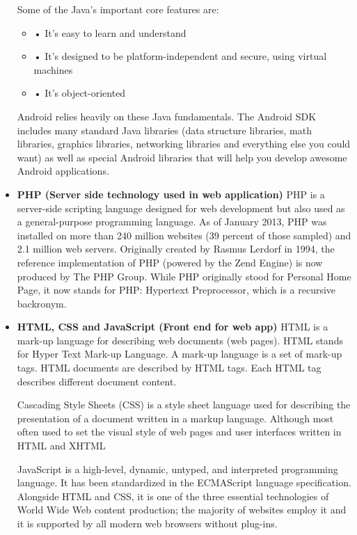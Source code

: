 \begin{itemize}
Some of the Java’s important core features are:
\begin{itemize}
\item	• It’s easy to learn and understand

\item •	It’s designed to be platform-independent and secure, using virtual machines

\item •	It’s object-oriented
\end{itemize}

Android relies heavily on these Java fundamentals. The Android SDK includes many standard Java libraries (data structure libraries, math libraries, graphics libraries, networking libraries and everything else you could want) as well as special Android libraries that will help you develop awesome Android applications.


\item	\textbf{PHP (Server side technology used in web application) }
PHP is a server-side scripting language designed for web development but also used as a general-purpose programming language. As of January 2013, PHP was installed on more than 240 million websites (39 percent of those sampled) and 2.1 million web servers. Originally created by Rasmus Lerdorf in 1994, the reference implementation of PHP (powered by the Zend Engine) is now produced by The PHP Group. While PHP originally stood for Personal Home Page, it now stands for PHP: Hypertext Preprocessor, which is a recursive backronym.

\item	\textbf{HTML, CSS and JavaScript (Front end for web app) }
HTML is a mark-up language for describing web documents (web pages). HTML stands for Hyper Text Mark-up Language. A mark-up language is a set of mark-up tags. HTML documents are described by HTML tags. Each HTML tag describes different document content.

Cascading Style Sheets (CSS) is a style sheet language used for describing the presentation of a document written in a markup language. Although most often used to set the visual style of web pages and user interfaces written in HTML and XHTML

JavaScript is a high-level, dynamic, untyped, and interpreted programming language. It has been standardized in the ECMAScript language specification. Alongside HTML and CSS, it is one of the three essential technologies of World Wide Web content production; the majority of websites employ it and it is supported by all modern web browsers without plug-ins.

\end{itemize}




